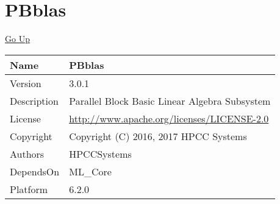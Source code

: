 \chapter*{\color{headtoc} PBblas}
\hypertarget{ecldoc:toc:root/PBblas}{}
\hyperlink{ecldoc:toc:}{Go Up}

\begin{tabularx}{\textwidth}{|l|X|}
\hline
Name &
PBblas
 \\
\hline
Version &
3.0.1
 \\
\hline
Description &
Parallel Block Basic Linear Algebra Subsystem
 \\
\hline
License &
\url{http://www.apache.org/licenses/LICENSE-2.0}
 \\
\hline
Copyright &
Copyright (C) 2016, 2017 HPCC Systems
 \\
\hline
Authors &
HPCCSystems
 \\
\hline
DependsOn &
ML\_Core
 \\
\hline
Platform &
6.2.0
 \\
\hline
\end{tabularx}

